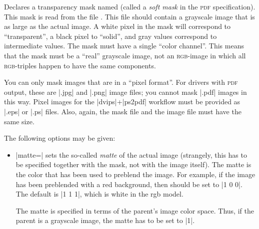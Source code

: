 \begin{command}{\pgfdeclaremask{}}
    Declares a transparency mask named  (called a \emph{soft
    mask} in the \textsc{pdf} specification). This mask is read from the file
    . This file should contain a grayscale image that is as
    large as the actual image. A white pixel in the mask will correspond to
    ``transparent'', a black pixel to ``solid'', and gray values correspond to
    intermediate values. The mask must have a single ``color channel''. This
    means that the mask must be a ``real'' grayscale image, not an
    \textsc{rgb}-image in which all \textsc{rgb}-triples happen to have the
    same components.

    You can only mask images that are in a ``pixel format''. For drivers with
    \textsc{pdf} output, these are |.jpg| and |.png| image files; you cannot
    mask |.pdf| images in this way. Pixel images for the |dvips|+|ps2pdf|
    workflow must be provided as |.eps| or |.ps| files. Also, again, the mask
    file and the image file must have the same size.

    The following options may be given:
    \begin{itemize}
        \item |matte=| sets the so-called \emph{matte}
            of the actual image (strangely, this has to be specified together
            with the mask, not with the image itself). The matte is the color
            that has been used to preblend the image. For example, if the image
            has been preblended with a red background, then  should be set to |{1 0 0}|. The default is |{1 1 1}|,
            which is white in the rgb model.

            The matte is specified in terms of the parent's image color space.
            Thus, if the parent is a grayscale image, the matte has to be set
            to |{1}|.
    \end{itemize}
    \example
\begin{codeexample}[]
\hbox{\hskip-14cm\hskip1cm
\hskip1cm
\hskip1cm
}
\end{codeexample}
\end{command}


